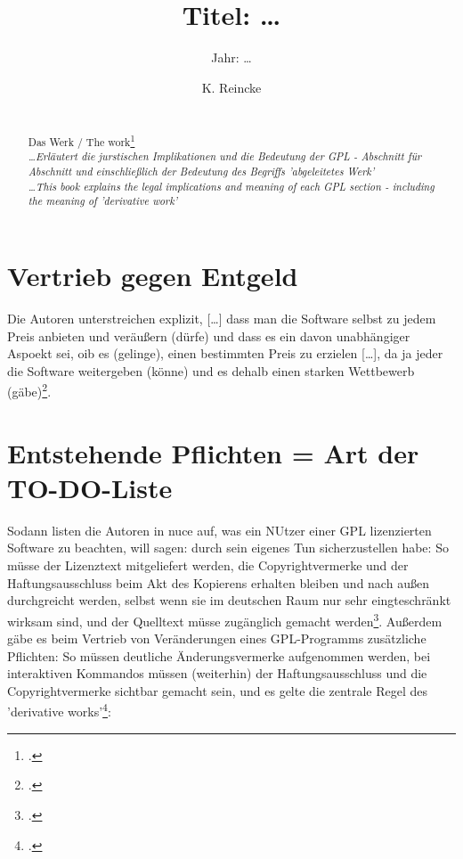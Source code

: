 \documentclass[DIV=calc,BCOR=5mm,11pt,headings=small,oneside,abstract=true, toc=bib]{scrartcl}
\begin{document}

\titlehead{Literaturexzerpt}
\subject{Autor(en): \ldots}
\title{Titel: \ldots}
\subtitle{Jahr: \ldots }
\author{K. Reincke}

\maketitle

\begin{abstract}
\noindent

\cite[(ist:)][]{ifross2005a} \\
Das Werk / The work\footcite[cf.][]{ifross2005a} \\
\noindent \itshape
\ldots Erläutert die jurstischen Implikationen und die Bedeutung der GPL -
Abschnitt für Abschnitt und einschließlich der Bedeutung des Begriffs
'abgeleitetes Werk' \\
\noindent
\ldots This book explains the legal implications and meaning of each GPL section
- including the meaning of 'derivative work'
\end{abstract}
\footnotesize
\normalsize

\section{Vertrieb gegen Entgeld}

Die Autoren unterstreichen explizit, \glqq{}[\ldots] dass man die Software
selbst zu jedem Preis anbieten und veräußern (dürfe)\grqq{} und dass es ein
davon unabhängiger Aspoekt sei, \glqq{}oib es (gelinge), einen bestimmten Preis
zu erzielen [\ldots], da ja jeder die Software weitergeben (könne) und es dehalb
einen starken Wettbewerb (gäbe)\grqq\footcite[cf.][15]{ifross2005a}.

\section{Entstehende Pflichten =  Art der TO-DO-Liste}

Sodann listen die Autoren in nuce auf, was ein NUtzer einer GPL lizenzierten
Software zu beachten, will sagen: durch sein eigenes Tun sicherzustellen habe:
So müsse der Lizenztext mitgeliefert werden, die Copyrightvermerke und der
Haftungsausschluss beim Akt des Kopierens erhalten bleiben und nach außen
durchgreicht werden, selbst wenn sie im deutschen Raum nur sehr eingteschränkt
wirksam sind, und der Quelltext müsse zugänglich gemacht
werden\footcite[cf.][16]{ifross2005a}. Außerdem gäbe es \glqq{}beim Vertrieb von
Veränderungen eines GPL-Programms\grqq{} zusätzliche Pflichten: So müssen
deutliche Änderungsvermerke aufgenommen werden, bei interaktiven Kommandos
müssen (weiterhin) der Haftungsausschluss und die Copyrightvermerke sichtbar
gemacht sein, und es gelte die zentrale Regel des 'derivative
works'\footcite[cf.][17]{ifross2005a}:
\end{document}
